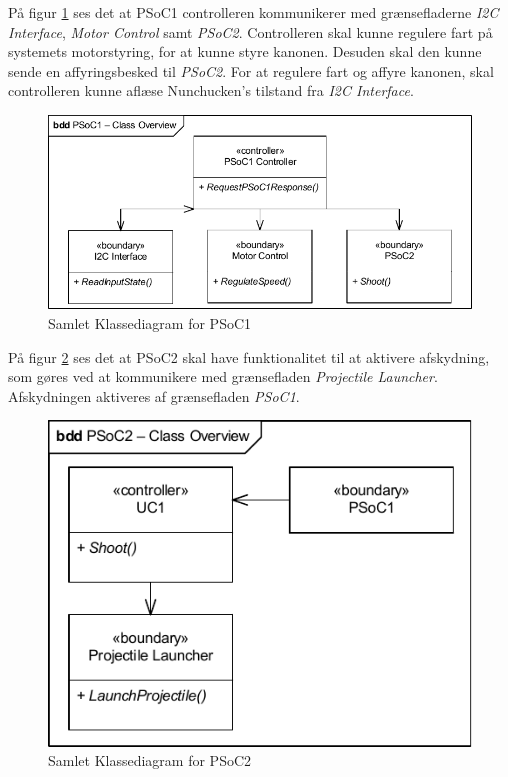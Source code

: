 På figur \ref{fig:CompleteClassDiagramPSoC1} ses det at PSoC1 controlleren kommunikerer med grænsefladerne \textit{I2C Interface}, \textit{Motor Control} samt \textit{PSoC2}. Controlleren skal kunne regulere fart på systemets motorstyring, for at kunne styre kanonen. Desuden skal den kunne sende en affyringsbesked til \textit{PSoC2}. For at regulere fart og affyre kanonen, skal controlleren kunne aflæse Nunchucken's tilstand fra \textit{I2C Interface}.
\begin{figure}[H]
	\centering
	\includegraphics[width=\textwidth] {Systemarkitektur/images/CompleteClassDiagramPSoC1}
	\caption{Samlet Klassediagram for PSoC1}
	\label{fig:CompleteClassDiagramPSoC1}
\end{figure}

På figur \ref{fig:CompleteClassDiagramPSoC2} ses det at PSoC2 skal have funktionalitet til at aktivere afskydning, som gøres ved at kommunikere med grænsefladen \textit{Projectile Launcher}. Afskydningen aktiveres af grænsefladen \textit{PSoC1}.
\begin{figure}[H]
	\centering
	\includegraphics[width=\textwidth] {Systemarkitektur/images/CompleteClassDiagramPSoC2}
	\caption{Samlet Klassediagram for PSoC2}
	\label{fig:CompleteClassDiagramPSoC2}
\end{figure}

